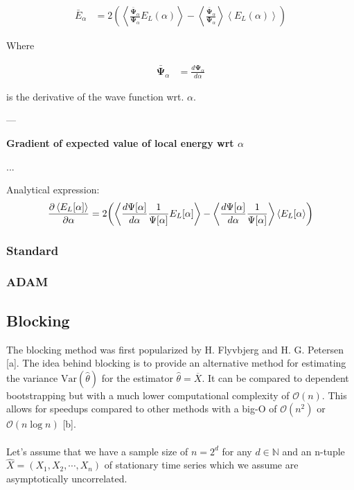 \begin{align}
    \bar{E}_\alpha &= 2\left( \left\langle \frac{\bar{\mathbf{\Psi}}_\alpha}{\mathbf{\Psi}_\alpha} E_L(\alpha) \right\rangle - \left\langle \frac{\bar{\mathbf{\Psi}}_\alpha}{\mathbf{\Psi}_\alpha}  \right\rangle \left\langle E_L(\alpha) \right\rangle \right)
\end{align}

Where

\begin{align}
    \bar{\mathbf{\Psi}}_\alpha &= \frac{d \mathbf{\Psi}_\alpha}{d\alpha}
\end{align}

is the derivative of the wave function wrt. $\alpha$.

---

\textbf{Gradient of expected value of local energy wrt $\alpha$}

...

Analytical expression: 
\begin{equation}\label{eq:grad_expval_E_L}
    \frac{\partial \expval{E_L[\mathbf{\alpha}]}}{\partial\mathbf{\alpha}} = 2\qty(\expval{\frac{d\Psi[\mathbf{\alpha}]}{d\mathbf{\alpha}}\frac{1}{\Psi[\mathbf{\alpha}]}E_L[\mathbf{\alpha}]} - \expval{\frac{d\Psi[\mathbf{\alpha}]}{d\mathbf{\alpha}}\frac{1}{\Psi[\mathbf{\alpha}]}}\expval{E_L[\mathbf{\alpha}})
\end{equation}

\subsubsection{Standard}

\subsubsection{ADAM}


\subsection{Blocking}

The blocking method was first popularized by H. Flyvbjerg and H. G. Petersen [a]. The idea behind blocking is to provide an alternative method for estimating the variance $\text{Var}(\hat{\theta})$ for the estimator $\hat{\theta} = \overline{X}$. It can be compared to dependent bootstrapping but with a much lower computational complexity of $\mathcal{O}(n)$. This allows for speedups compared to other methods with a big-O of $\mathcal{O}(n^2)$ or $\mathcal{O}(n \log n)$ [b]. \\\\
Let's assume that we have a sample size of $n = 2^d$ for any $d \in \mathbb{N}$ and an n-tuple $\hat{X} = (X_1, X_2, \cdots, X_n)$ of stationary time series which we assume are asymptotically uncorrelated. 


